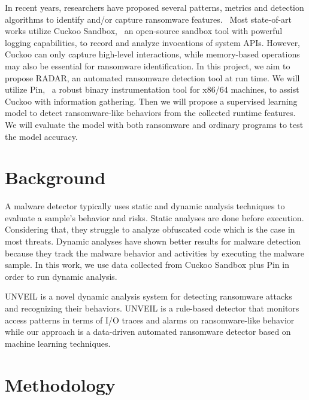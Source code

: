 \documentclass[letterpaper,twocolumn,10pt]{article}
\newcommand{\work}{\mbox{\textsc{RADAR}}\xspace}
\begin{document}
In recent years, researchers have proposed several patterns, metrics and detection algorithms to identify and/or capture ransomware features.~\cite{Chen2019AutomatedRB, 8051108, Morat2018RansomwareED, Verma2018DefiningAM}
Most state-of-art works utilize Cuckoo Sandbox,~\cite{CuckooSS} an open-source sandbox tool with powerful logging capabilities, to record and analyze invocations of system APIs.
However, Cuckoo can only capture high-level interactions, while memory-based operations may also be essential for ransomware identification.
In this project, we aim to propose \work, an automated ransomware detection tool at run time.
We will utilize Pin,~\cite{pin} a robust binary instrumentation tool for x86/64 machines, to assist Cuckoo with information gathering.
Then we will propose a supervised learning model to detect ransomware-like behaviors from the collected runtime features.
We will evaluate the model with both ransomware and ordinary programs to test the model accuracy.

\section{Background}

A malware detector typically uses static and dynamic analysis techniques to evaluate a sample's behavior and risks. Static analyses are done before execution. Considering that, they struggle to analyze obfuscated code which is the case in most threats. Dynamic analyses have shown better results for malware detection because they track the malware behavior and activities by executing the malware sample. In this work, we use data collected from Cuckoo Sandbox plus Pin in order to run dynamic analysis. 

UNVEIL \cite{197235} is a novel dynamic analysis system for detecting ransomware attacks and recognizing their behaviors. UNVEIL is a rule-based detector that monitors access patterns in terms of I/O traces and alarms on ransomware-like behavior while our approach is a data-driven automated ransomware detector based on machine learning techniques.

\section{Methodology}
\end{document}
